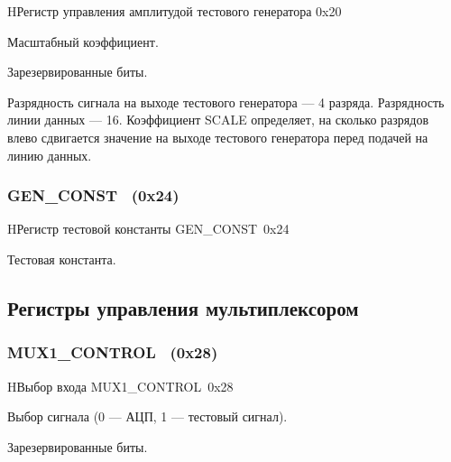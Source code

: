 \begin{register}{H}{Регистр управления амплитудой тестового генератора \regnam}{0x20}
\label{regsamplecount}%
%
%
\regnewline%

\begin{regdesc}\begin{reglist}
\item [SCALE (rw)]
Масштабный коэффициент.
\item [Reserved]
Зарезервированные биты.
\end{reglist}\end{regdesc}
\end{register}

Разрядность сигнала на выходе тестового генератора --- 4 разряда. Разрядность линии данных
--- 16. Коэффициент SCALE определяет, на сколько разрядов влево сдвигается значение на
выходе тестового генератора перед подачей на линию данных.

\subsubsection{GEN\_CONST~ (0x24)}
\renewcommand{\regnam}{GEN\_CONST~}
\label{sec:GEN_CONST}

\begin{register}{H}{Регистр тестовой константы \regnam}{0x24}
\label{regsamplecount}%
%
\regnewline%

\begin{regdesc}\begin{reglist}
\item [CONST (rw)]
Тестовая константа.
\end{reglist}\end{regdesc}
\end{register}

\subsection{Регистры управления мультиплексором}

\subsubsection{MUX1\_CONTROL~ (0x28)}
\renewcommand{\regnam}{MUX1\_CONTROL~}
\label{sec:MUX1_CONTROL}

\begin{register}{H}{Выбор входа \regnam}{0x28}
\label{regsamplecount}%
%
%
\regnewline%

\begin{regdesc}\begin{reglist}
\item [SELECT (rw)]
Выбор сигнала (0 --- АЦП, 1 --- тестовый сигнал).
\item [Reserved]
Зарезервированные биты.
\end{reglist}\end{regdesc}
\end{register}

